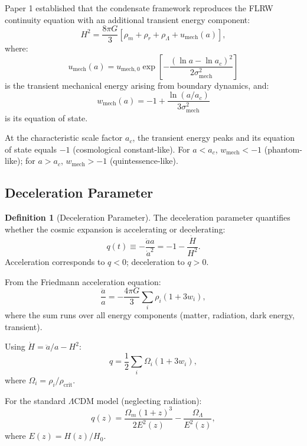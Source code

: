 \documentclass[11pt,a4paper]{article}
\newcommand{\umech}{\ensuremath{u_{\mathrm{mech}}}}
\newcommand{\wmech}{\ensuremath{w_{\mathrm{mech}}}}
\newcommand{\OmegaLam}{\ensuremath{\Omega_\Lambda}}
\newcommand{\OmegaM}{\ensuremath{\Omega_m}}
\theoremstyle{definition}
\newtheorem{definition}[theorem]{Definition}
\theoremstyle{remark}
\begin{document}
Paper 1 established that the condensate framework reproduces the FLRW continuity equation with an additional transient energy component:
\begin{equation}
H^2 = \frac{8\pi G}{3}\left[\rho_m + \rho_r + \rho_\Lambda + \umech(a)\right],
\end{equation}
where:
\begin{equation}
\umech(a) = u_{\mathrm{mech},0} \exp\left[-\frac{(\ln a - \ln a_c)^2}{2\sigma_{\mathrm{mech}}^2}\right]
\end{equation}
is the transient mechanical energy arising from boundary dynamics, and:
\begin{equation}
\wmech(a) = -1 + \frac{\ln(a/a_c)}{3\sigma_{\mathrm{mech}}^2}
\end{equation}
is its equation of state.

At the characteristic scale factor $a_c$, the transient energy peaks and its equation of state equals $-1$ (cosmological constant-like). For $a < a_c$, $\wmech < -1$ (phantom-like); for $a > a_c$, $\wmech > -1$ (quintessence-like).

\subsection{Deceleration Parameter}
\label{sec:deceleration}

\begin{definition}[Deceleration Parameter]
The deceleration parameter quantifies whether the cosmic expansion is accelerating or decelerating:
\begin{equation}
q(t) \equiv -\frac{\ddot{a}a}{\dot{a}^2} = -1 - \frac{\dot{H}}{H^2}.
\end{equation}
Acceleration corresponds to $q < 0$; deceleration to $q > 0$.
\end{definition}

From the Friedmann acceleration equation:
\begin{equation}
\frac{\ddot{a}}{a} = -\frac{4\pi G}{3}\sum_i \rho_i(1 + 3w_i),
\end{equation}
where the sum runs over all energy components (matter, radiation, dark energy, transient).

Using $\dot{H} = \ddot{a}/a - H^2$:
\begin{equation}
q = \frac{1}{2}\sum_i \Omega_i(1 + 3w_i),
\end{equation}
where $\Omega_i = \rho_i/\rho_{\mathrm{crit}}$.

For the standard $\Lambda$CDM model (neglecting radiation):
\begin{equation}
q(z) = \frac{\OmegaM(1+z)^3}{2E^2(z)} - \frac{\OmegaLam}{E^2(z)},
\end{equation}
where $E(z) = H(z)/H_0$.
\end{document}
